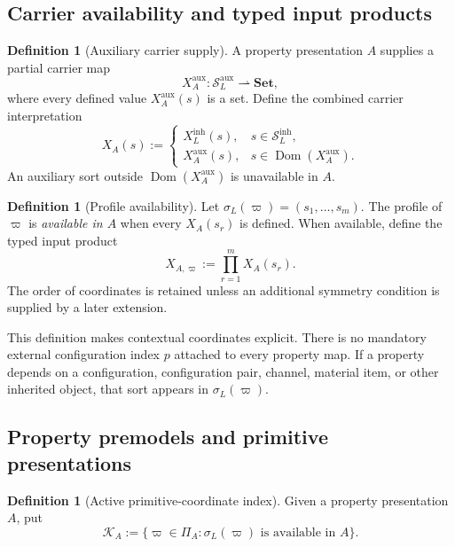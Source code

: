 \documentclass[11pt]{article}
\newcommand{\Sin}{\mathcal S_{L}^{\mathrm{inh}}}
\newcommand{\Saux}{\mathcal S_{L}^{\mathrm{aux}}}
\newcommand{\Dom}{\operatorname{Dom}}
\theoremstyle{definition}
\newtheorem{definition}[theorem]{Definition}
\theoremstyle{remark}
\begin{document}
\subsection{Carrier availability and typed input products}

\begin{definition}[Auxiliary carrier supply]
A property presentation \(A\) supplies a partial carrier map
\[
X_A^{\mathrm{aux}}:\Saux\rightharpoonup \mathbf{Set},
\]
where every defined value \(X_A^{\mathrm{aux}}(s)\) is a set.
Define the combined carrier interpretation
\[
X_A(s):=
\begin{cases}
X_L^{\mathrm{inh}}(s), & s\in\Sin,\\
X_A^{\mathrm{aux}}(s), & s\in\Dom(X_A^{\mathrm{aux}}).
\end{cases}
\]
An auxiliary sort outside \(\Dom(X_A^{\mathrm{aux}})\) is unavailable in \(A\).
\end{definition}

\begin{definition}[Profile availability]
Let \(\sigma_L(\varpi)=(s_1,\ldots,s_m)\).
The profile of \(\varpi\) is \emph{available in \(A\)} when every \(X_A(s_r)\) is defined.
When available, define the typed input product
\[
X_{A,\varpi}:=\prod_{r=1}^{m}X_A(s_r).
\]
The order of coordinates is retained unless an additional symmetry condition is supplied by a later extension.
\end{definition}

This definition makes contextual coordinates explicit.
There is no mandatory external configuration index \(p\) attached to every property map.
If a property depends on a configuration, configuration pair, channel, material item, or other inherited object, that sort appears in \(\sigma_L(\varpi)\).

\subsection{Property premodels and primitive presentations}

\begin{definition}[Active primitive-coordinate index]
\label{def:active-index}
Given a property presentation \(A\), put
\[
\mathcal K_A:=
\{\varpi\in\Pi_A:
\sigma_L(\varpi)\text{ is available in }A\}.
\]
\end{definition}
\end{document}
